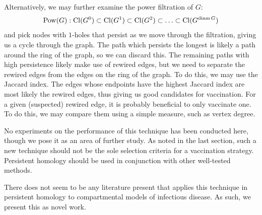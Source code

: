Alternatively, we may further examine the power filtration of $G$:
\[ \operatorname{Pow}(G): \operatorname{Cl}(G^0) \subset \operatorname{Cl}(G^1) \subset \operatorname{Cl}(G^2) \subset \ldots \subset \operatorname{Cl}(G^{\operatorname{diam} G}) \]
and pick nodes with $1$-holes that persist as we move through the filtration, giving us a cycle through the graph. The path which persists the longest is likely a path around the ring of the graph, so we can discard this. The remaining paths with high persistence likely make use of rewired edges, but we need to separate the rewired edges from the edges on the ring of the graph. To do this, we may use the Jaccard index. The edges whose endpoints have the highest Jaccard index are most likely the rewired edges, thus giving us good candidates for vaccination. For a given (suspected) rewired edge, it is probably beneficial to only vaccinate one. To do this, we may compare them using a simple measure, such as vertex degree. 

No experiments on the performance of this technique has been conducted here, though we pose it as an area of further study. As noted in the last section, such a new technique should not be the sole selection criteria for a vaccination strategy. Persistent homology should be used in conjunction with other well-tested methods. 

There does not seem to be any literature present that applies this technique in persistent homology to compartmental models of infectious disease. As such, we present this as novel work. 
